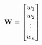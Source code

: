 \documentclass[preview]{standalone}
\begin{document}
\begin{align*}
\special{dvisvgm:raw <g id='unique000'>}\mathbf{W} = \begin{bmatrix} w_1 \\ w_2 \\ \vdots \\ w_n \end{bmatrix}\special{dvisvgm:raw </g>}
\end{align*}
\end{document}
